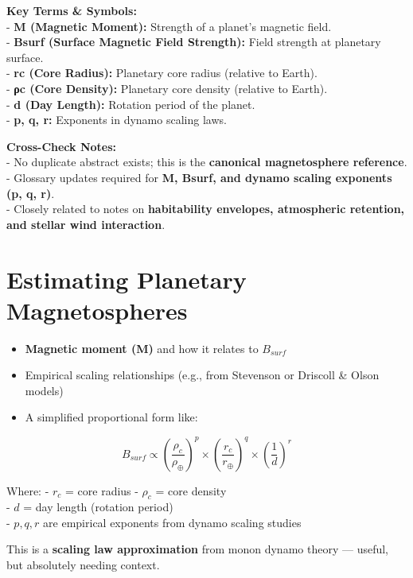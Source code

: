 \documentclass[
  letterpaper,
]{book}
\providecommand{\tightlist}{%
  \setlength{\itemsep}{0pt}\setlength{\parskip}{0pt}}
\begin{document}
\textbf{Key Terms \& Symbols:}\\
- \textbf{M (Magnetic Moment):} Strength of a planet's magnetic field.\\
- \textbf{Bsurf (Surface Magnetic Field Strength):} Field strength at
planetary surface.\\
- \textbf{rc (Core Radius):} Planetary core radius (relative to
Earth).\\
- \textbf{ρc (Core Density):} Planetary core density (relative to
Earth).\\
- \textbf{d (Day Length):} Rotation period of the planet.\\
- \textbf{p, q, r:} Exponents in dynamo scaling laws.

\textbf{Cross-Check Notes:}\\
- No duplicate abstract exists; this is the \textbf{canonical
magnetosphere reference}.\\
- Glossary updates required for \textbf{M, Bsurf, and dynamo scaling
exponents (p, q, r)}.\\
- Closely related to notes on \textbf{habitability envelopes,
atmospheric retention, and stellar wind interaction}.

\chapter{Estimating Planetary
Magnetospheres}\label{estimating-planetary-magnetospheres}

\begin{itemize}
\tightlist
\item
  \textbf{Magnetic moment (M)} and how it relates to \(B_{surf}\)\\
\item
  Empirical scaling relationships (e.g., from Stevenson or Driscoll \&
  Olson models)\\
\item
  A simplified proportional form like:
\end{itemize}

\[
B_{surf} \propto \left(\dfrac{\rho_c}{\rho_\oplus}\right)^p \times \left(\dfrac{r_c}{r_\oplus}\right)^q \times \left(\dfrac{1}{d}\right)^r
\]

Where: - \(r_c\) = core radius - \(\rho_c\) = core density\\
- \(d\) = day length (rotation period)\\
- \(p, q, r\) are empirical exponents from dynamo scaling studies

This is a \textbf{scaling law approximation} from monon dynamo theory
--- useful, but absolutely needing context.
\end{document}
